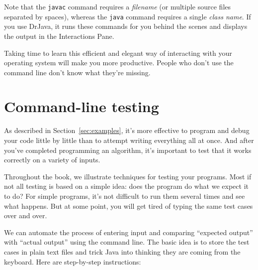 \documentclass[12pt]{book}
\theoremstyle{exercise}
\begin{document}
Note that the {\tt javac} command requires a {\em filename} (or multiple source files separated by spaces), whereas the {\tt java} command requires a single {\em class name}.
If you use DrJava, it runs these commands for you behind the scenes and displays the output in the Interactions Pane.

Taking time to learn this efficient and elegant way of interacting with your operating system will make you more productive.
People who don't use the command line don't know what they're missing.


\section{Command-line testing}
\label{cltesting}

As described in Section~\ref{sec:examples}, it's more effective to program and debug your code little by little than to attempt writing everything all at once.
And after you've completed programming an algorithm, it's important to test that it works correctly on a variety of inputs.

Throughout the book, we illustrate techniques for testing your programs.
Most if not all testing is based on a simple idea: does the program do what we expect it to do?
For simple programs, it's not difficult to run them several times and see what happens.
But at some point, you will get tired of typing the same test cases over and over.

We can automate the process of entering input and comparing ``expected output'' with ``actual output'' using the command line.
The basic idea is to store the test cases in plain text files and trick Java into thinking they are coming from the keyboard.
Here are step-by-step instructions:
\end{document}
